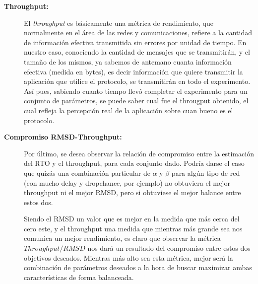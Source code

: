 \begin{description}
    \bigskip
    \item[\textbf{Throughput:}] El \emph{throughput}\cite{throughput} es
        b\'asicamente una m\'etrica de rendimiento, que normalmente en el \'area
        de las redes y comunicaciones, refiere a la cantidad de informaci\'on
        efectiva transmitida sin errores por unidad de tiempo.
        En nuestro caso, conociendo la cantidad de mensajes que se
        transmitir\'an, y el tama\~no de los mismos, ya sabemos de antemano
        cuanta informaci\'on efectiva (medida en bytes), es decir informaci\'on
        que quiere transmitir la aplicaci\'on que utilice el protocolo, se
        transmitir\'an en todo el experimento. As\'i pues, sabiendo cuanto
        tiempo llev\'o completar el experimento para un conjunto de
        par\'ametros, se puede saber cual fue el througput obtenido, el cual
        refleja la percepci\'on real de la aplicaci\'on sobre cuan bueno es el
        protocolo.

    \bigskip
    \item[\textbf{Compromiso RMSD-Throughput:}] Por \'ultimo, se desea observar
        la relaci\'on de compromiso entre la estimaci\'on del RTO y el
        throughput, para cada conjunto dado. Podr\'ia darse el caso que quiz\'as
        una combinaci\'on particular de $\alpha$ y $\beta$ para alg\'un tipo de
        red (con mucho delay y dropchance, por ejemplo) no obtuviera el mejor
        throughput ni el mejor RMSD, pero si obtuviese el mejor balance entre
        estos dos.

        \par Siendo el RMSD un valor que es mejor en la medida que m\'as cerca
        del cero este, y el throughput una medida que mientras m\'as grande sea
        nos comunica un mejor rendimiento, es claro que observar la m\'etrica
        $Throughput / RMSD$ nos dar\'a un resultado del compromiso entre estos
        dos objetivos deseados. Mientras m\'as alto sea esta m\'etrica, mejor
        ser\'a la combinaci\'on de par\'ametros deseados a la hora de buscar
        maximizar ambas caracter\'isticas de forma balanceada.

\end{description}

